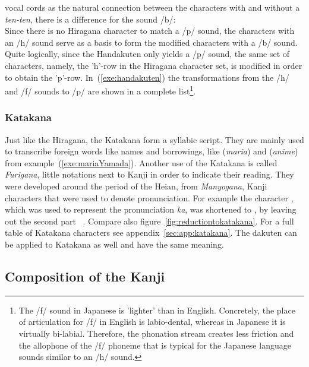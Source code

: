 vocal cords as the natural connection between the characters with and without 
a \emph{ten-ten}, there is a difference for the sound /b/:\\
Since there is no Hiragana character to match a /p/ sound, the characters with
an /h/ sound serve as a basis to form the modified characters with a /b/ sound.
Quite logically, since the Handakuten only yields a /p/ sound, the same set of
characters, namely, the 'h'-row in the Hiragana character set, is modified in 
order to obtain the 'p'-row. In~(\ref{exe:handakuten}) the transformations from 
the /h/ and /f/ sounds to /p/ are shown in a complete list\footnote{
The /f/ sound in Japanese is 'lighter' than in English. Concretely, the place of
articulation for /f/ in English is labio-dental, whereas in Japanese it is 
virtually bi-labial. Therefore, the phonation stream creates less friction and
the allophone of the /f/ phoneme that is typical for the Japanese language sounds
similar to an /h/ sound.}.

\subsubsection{Katakana }
\label{sec:katakana}

Just like the Hiragana, the Katakana form a syllabic script. They are mainly used
to transcribe foreign words like names and borrowings, like 
(\emph{maria}) and  (\emph{anime}) from 
example~(\ref{exe:mariaYamada}). Another use of the Katakana is called 
\emph{Furigana}, little notations next to Kanji in order to indicate their 
reading. They were developed around the period of the Heian, from 
\emph{Manyogana}, Kanji characters that were used to denote pronunciation.
For example the character , which was used to represent the pronunciation
\emph{ka}, was shortened to , by leaving out the second part 
~. Compare also figure~\ref{fig:reductiontokatakana}. For a full table of Katakana characters see 
appendix~\ref{sec:app:katakana}. The dakuten can be applied to Katakana as well 
and have the same meaning.

\subsection{Composition of the Kanji }
\label{sec:compositionofkanji}

